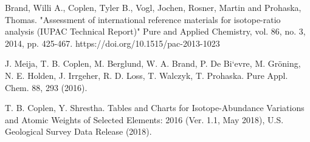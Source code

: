 \documentclass[a5paper,openany]{book}
\begin{document}
\begin{thebibliography}{99}
		
		
		
		Brand, Willi A., Coplen, Tyler B., Vogl, Jochen, Rosner, Martin and Prohaska, Thomas. "Assessment of international reference materials for isotope-ratio analysis (IUPAC Technical Report)" Pure and Applied Chemistry, vol. 86, no. 3, 2014, pp. 425-467. https://doi.org/10.1515/pac-2013-1023
		
		
		J. Meija, T. B. Coplen, M. Berglund, W. A. Brand, P. De Bi`evre, M. Gröning, N. E. Holden, J. Irrgeher, R. D. Loss, T. Walczyk, T. Prohaska. Pure Appl. Chem. 88, 293 (2016).
		
		
		
		
		
		  T. B. Coplen, Y. Shrestha. Tables and Charts for Isotope-Abundance Variations and Atomic Weights of Selected Elements: 2016
		(Ver. 1.1, May 2018), U.S. Geological Survey Data Release (2018).
		

\end{thebibliography}
\end{document}
